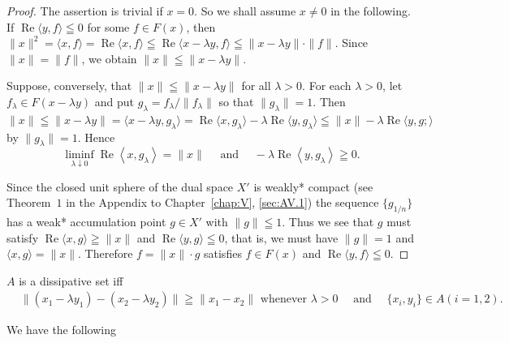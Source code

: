 \begin{proof}
 The assertion is trivial if $x = 0$. So we shall assume $x \neq 0$ in the following. If $\operatorname{Re}\langle y, f \rangle \leqq 0$ for some $f \in F(x)$, then $\|x\|^2 = \langle x, f \rangle = \operatorname{Re}\langle x, f \rangle \leqq \operatorname{Re}\langle x - \lambda y, f \rangle \leqq \|x - \lambda y\| \cdot \|f\|$. Since $\|x\| = \|f\|$, we obtain $\|x\| \leqq \|x - \lambda y\|$. 

Suppose, conversely, that $\|x\| \leqq \|x - \lambda y\|$ for all $\lambda > 0$. For each $\lambda > 0$, let $f_{\lambda} \in F(x - \lambda y)$ and put $g_{\lambda} = f_{\lambda} / \|f_{\lambda}\|$ so that $\|g_{\lambda}\| = 1$. Then $\|x\| \leqq \|x - \lambda y\| = \langle x - \lambda y, g_{\lambda} \rangle = \operatorname{Re}\langle x, g_{\lambda} \rangle - \lambda \operatorname{Re}\langle y, g_{\lambda} \rangle \leqq \|x\| - \lambda \operatorname{Re}\langle y, g; \rangle$ by $\|g_{\lambda}\| = 1$. Hence 
\[
\liminf\limits _{\lambda \downarrow 0} \operatorname{Re} \left\langle x, g _{\lambda} \right\rangle = \| x \| \quad \text{ and } \quad - \lambda \operatorname{Re} \left\langle y, g _{\lambda} \right\rangle \geqq 0.
\]

Since the closed unit sphere of the dual space $X'$ is weakly* compact (see Theorem~\hyperref[thm:AV.1.Theorem.1]{$1$} in the Appendix to Chapter~\ref{chap:V}, \ref{sec:AV.1}) the sequence $\{g_{1/n}\}$ has a weak* accumulation point $g \in X'$ with $\|g\| \leqq 1$. Thus we see that $g$ must satisfy $\operatorname{Re}\langle x, g \rangle \geqq \|x\|$ and $\operatorname{Re}\langle y, g \rangle \leqq 0$, that is, we must have $\|g\| = 1$ and $\langle x, g \rangle = \|x\|$. Therefore $f = \|x\| \cdot g$ satisfies $f \in F(x)$ and $\operatorname{Re}\langle y, f \rangle \leqq 0$. 
\end{proof}

\begin{corollaryu} $A$ is a dissipative set iff 
\begin{equation}\label{eq:XIV.6.5}
\begin{aligned}
&{\| (x _{1} - \lambda y _{1}) - (x _{2} - \lambda y _{2}) \| \geqq \| x _{1} - x _{2} \| \text{ whenever } \lambda > 0} {\quad \text{ and } \quad \{x _{i}, y _{i} \} \in A (i = 1, 2).}
\end{aligned}
\end{equation}
\end{corollaryu}

We have the following 

